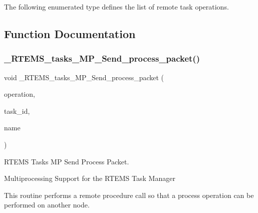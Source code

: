 The following enumerated type defines the list of remote task operations. 

\subsection{Function Documentation}
\mbox{\label{group__ClassicTaskMP_gad070e30bf976120083bbc1af1a9db9d8}} 
\subsubsection{\texorpdfstring{\_RTEMS\_tasks\_MP\_Send\_process\_packet()}{\_RTEMS\_tasks\_MP\_Send\_process\_packet()}}
{\footnotesize\ttfamily void \+\_\+\+R\+T\+E\+M\+S\+\_\+tasks\+\_\+\+M\+P\+\_\+\+Send\+\_\+process\+\_\+packet (\begin{DoxyParamCaption}\item[{\mbox{\hyperlink{group__ClassicTaskMP_ga8898253dbfcff93eb97b8646eefd1fa3}{R\+T\+E\+M\+S\+\_\+tasks\+\_\+\+M\+P\+\_\+\+Remote\+\_\+operations}}}]{operation,  }\item[{\mbox{\hyperlink{group__RTEMSScoreObject_ga5821f52a51072941bdd603e542d0863e}{Objects\+\_\+\+Id}}}]{task\+\_\+id,  }\item[{\mbox{\hyperlink{group__ClassicTasks_ga55fb63c49f68c0cbd9bee004da15b1fd}{rtems\+\_\+name}}}]{name }\end{DoxyParamCaption})}



R\+T\+E\+MS Tasks MP Send Process Packet. 

Multiprocessing Support for the R\+T\+E\+MS Task Manager

This routine performs a remote procedure call so that a process operation can be performed on another node. 